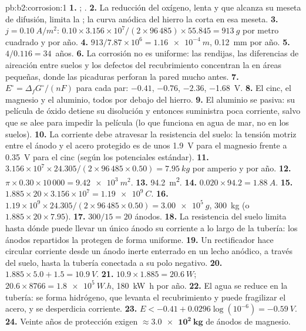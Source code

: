 \begin{solution}{pb:b2:corrosion:1}
\textbf{1.} ; .
\textbf{2.} La reducción del oxígeno, lenta y que alcanza su meseta de difusión,
limita la ; la curva anódica del hierro la corta en esa meseta.
\textbf{3.} $j = \qty{0.10}{A/m^2}$: $0.10 \times 3.156 \times 10^7/(2 \times 96\,485)
\times 55.845 = \qty{913}{g}$ por metro cuadrado y por año.
\textbf{4.} $913/7.87 \times 10^6 = \qty{1.16e-4}{m}$, \qty{0.12}{mm} por año.
\textbf{5.} $4/0.116 = 34$~años.
\textbf{6.} La corrosión no es uniforme: las rendijas, las diferencias de aireación
entre suelos y los defectos del recubrimiento concentran la  en
áreas pequeñas, donde las picaduras perforan la pared mucho antes.
\textbf{7.} $E^\circ = \Delta_f G^\circ/(nF)$ para cada par:  $-0.41$,  $-0.76$,
 $-2.36$,  \qty{-1.68}{V}.
\textbf{8.} El cinc, el magnesio y el aluminio, todos por debajo del hierro.
\textbf{9.} El aluminio se pasiva: su película de óxido detiene su disolución y
entonces suministra poca corriente, salvo que se alee para impedir la película (lo que funciona
en agua de mar, no en los suelos).
\textbf{10.} La corriente debe atravesar la resistencia del suelo: la tensión
motriz entre el ánodo y el acero protegido es de unos \qty{1.9}{V} para el
magnesio frente a \qty{0.35}{V} para el cinc (según los potenciales estándar).
\textbf{11.} $3.156 \times 10^7 \times 24.305/(2 \times 96\,485 \times 0.50) =
\qty{7.95}{kg}$ por amperio y por año.
\textbf{12.} $\pi \times 0.30 \times 10\,000 = \qty{9.42e3}{m^2}$.
\textbf{13.} \qty{94.2}{m^2}.
\textbf{14.} $0.020 \times 94.2 = \qty{1.88}{A}$.
\textbf{15.} $1.885 \times 20 \times 3.156 \times 10^7 = \qty{1.19e9}{C}$.
\textbf{16.} $1.19 \times 10^9 \times 24.305/(2 \times 96\,485 \times 0.50) =
\qty{3.00e5}{g}$, \qty{300}{kg} (o $1.885 \times 20 \times 7.95$).
\textbf{17.} $300/15 = 20$ ánodos.
\textbf{18.} La resistencia del suelo limita hasta dónde puede llevar un único ánodo
su corriente a lo largo de la tubería: los ánodos repartidos la protegen de forma uniforme.
\textbf{19.} Un rectificador hace circular corriente desde un ánodo inerte enterrado en un lecho
anódico, a través del suelo, hasta la tubería conectada a su polo negativo.
\textbf{20.} $1.885 \times 5.0 + 1.5 = \qty{10.9}{V}$.
\textbf{21.} $10.9 \times 1.885 = \qty{20.6}{W}$; $20.6 \times 8766 = \qty{1.8e5}{W.h}$,
\qty{180}{kW.h} por año.
\textbf{22.} El agua se reduce en la tubería: se forma hidrógeno, que levanta el recubrimiento y
puede fragilizar el acero, y se desperdicia corriente.
\textbf{23.} $E < -0.41 + 0.0296\log(10^{-6}) = \qty{-0.59}{V}$.
\textbf{24.} Veinte años de protección exigen $\boldsymbol{\approx \qty{3.0e2}{kg}}$
de ánodos de magnesio.
\end{solution}
